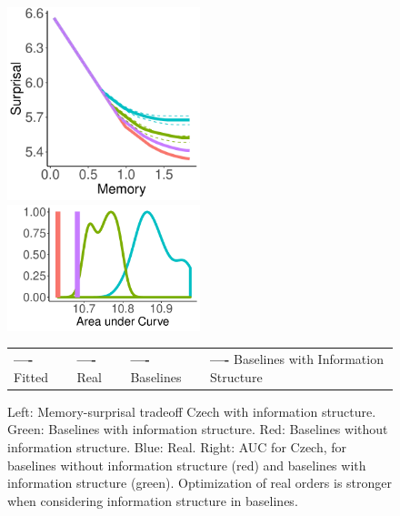 \begin{figure}
\includegraphics[width=0.5\textwidth]{figures/Czech-PDT-listener-surprisal-memory-MEDIANS_onlyWordForms_boundedVocab.pdf}
\includegraphics[width=0.5\textwidth]{figures/Czech-PDT-listener-surprisal-memory-HIST_AUC_onlyWordForms_boundedVocab_REAL-infostruc.pdf}

\begin{center}
\begin{tabular}{llll}
\textbf{\textcolor{fitted_czech}{----}} Fitted&
\textbf{\textcolor{real_czech}{----}} Real&
\textbf{\textcolor{baseline_czech}{----}} Baselines&
\textbf{\textcolor{baselineInfo_czech}{----}} Baselines with Information Structure
\end{tabular}
\end{center}
	\caption{Left: Memory-surprisal tradeoff Czech with information structure. Green: Baselines with information structure. Red: Baselines without information structure. Blue: Real. Right: AUC for Czech, for baselines without information structure (red) and baselines with information structure (green). Optimization of real orders is stronger when considering information structure in baselines. }\label{fig:median-czech-infostruc}
\end{figure}



